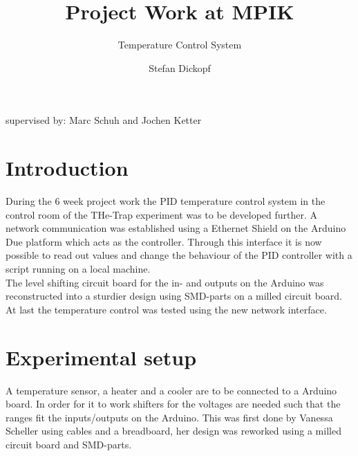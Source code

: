\documentclass[12pt]{scrartcl}
\begin{document}
  \title{Project Work at MPIK}
  \subtitle{Temperature Control System}
  \date{}
  \author{Stefan Dickopf}
  \maketitle
  \vspace{50pt} {\centering supervised by: Marc Schuh and Jochen Ketter\\}
  \thispagestyle{empty}
  \clearpage
  \tableofcontents
  \thispagestyle{empty}
  \clearpage
  \setcounter{page}{1}

  \section{Introduction}
    During the 6 week project work the PID temperature control system in the
    control room of the THe-Trap experiment was to be developed further. A
    network communication was established using a Ethernet Shield on
    the Arduino Due platform which acts as the controller. Through this
    interface it is now possible to read out values and change the behaviour
    of the PID controller with a script running on a local machine.\\
    The level shifting circuit board for the in- and outputs on the Arduino
    was reconstructed into a sturdier design using SMD-parts on a milled
    circuit board.\\
    At last the temperature control was tested using the new network interface.

  \section{Experimental setup}
    A temperature sensor, a heater and a cooler are to be connected to a Arduino
    board. In order for it to work shifters for the voltages are needed such that the
    ranges fit the inputs/outputs on the Arduino. This was first done by
    Vanessa Scheller using cables and a breadboard, her design was reworked
    using a milled circuit board and SMD-parts.
\end{document}
